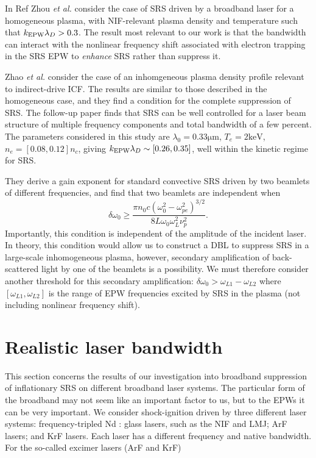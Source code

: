 In Ref \cite{zhou_kinetic_2018} Zhou \textit{et al.} consider the case of SRS
driven by a broadband laser for a homogeneous plasma, with NIF-relevant plasma
density and temperature such that $k_\mathrm{EPW}\lambda_D > 0.3$. The result most relevant to our
work is that the bandwidth can interact with the nonlinear frequency shift associated
with electron trapping in the SRS EPW to \emph{enhance} SRS rather than suppress it.



Zhao \textit{et al.} \cite{zhao_effective_2017} consider the case of an
inhomgeneous plasma density profile relevant to indirect-drive ICF. The results
are similar to those described in the homogeneous case, and they find a
condition for the complete suppression of SRS. The follow-up paper
\cite{zhao_suppression_2019} finds that SRS can be well controlled for a laser
beam structure of multiple frequency components and total bandwidth of a few
percent. The parameters considered in this study are
$\lambda_0=0.33\si{\micro\metre}$,
$T_e=2\si{\kilo\electronvolt}$, $n_e = [0.08,0.12]n_c$, giving $k_\mathrm{EPW}\lambda_D \sim
[0.26,0.35]$, well within the kinetic regime for SRS.

They derive a gain exponent for standard convective SRS driven by two
beamlets of different frequencies, and find that two beamlets are independent
when
\begin{equation}\label{DLB_threshold_inhomo}
\delta \omega_{0} \geq \frac{\pi n_{0} c\left(\omega_{0}^{2}-\omega_{p
e}^{2}\right)^{3 / 2}}{8 L \omega_{0} \omega_{L}^{2} \nu_{p}^{2}}.
\end{equation}
Importantly, this condition is independent of the amplitude of the incident
laser. In theory, this condition would allow us to construct a DBL to suppress
SRS in a large-scale inhomogeneous plasma, however, secondary amplification of
back-scattered light by one of the beamlets is a possibility. We must therefore
consider another threshold for this secondary amplification: $\delta\omega_0 >
\omega_{L1}-\omega_{L2}$ where $[\omega_{L1},\omega_{L2}]$ is the range of EPW
frequencies excited by SRS in the plasma (not including nonlinear frequency
shift).





\section{Realistic laser bandwidth}

This section concerns the results of our investigation into broadband suppression of inflationary SRS on different broadband laser systems. The particular form of the broadband may not seem like an important factor to us, but to the EPWs it can be very important.
We consider shock-ignition driven by three different laser systems: frequency-tripled Nd : glass lasers, such as the NIF and LMJ; ArF lasers; and KrF lasers. Each laser has a different frequency and native bandwidth. For the so-called excimer lasers (ArF and KrF) 

